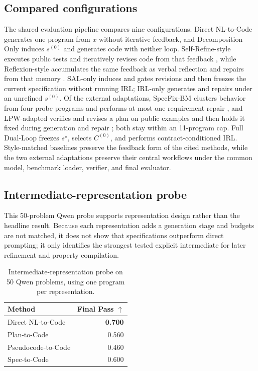 \documentclass{article}
\newcommand{\up}{\ensuremath{\uparrow}}
\begin{document}
\subsection{Compared configurations}

The shared evaluation pipeline compares nine configurations. Direct NL-to-Code generates one program from $x$ without iterative feedback, and Decomposition Only induces $s^{(0)}$ and generates code with neither loop. Self-Refine-style executes public tests and iteratively revises code from that feedback \citep{ref_self_refine}, while Reflexion-style accumulates the same feedback as verbal reflection and repairs from that memory \citep{ref_reflexion}. SAL-only induces and gates revisions and then freezes the current specification without running IRL; IRL-only generates and repairs under an unrefined $s^{(0)}$. Of the external adaptations, SpecFix-BM clusters behavior from four probe programs and performs at most one requirement repair \citep{ref_specfix}, and LPW-adapted verifies and revises a plan on public examples and then holds it fixed during generation and repair \citep{ref_planning_driven_programming}; both stay within an 11-program cap. Full Dual-Loop freezes $s^\star$, selects $C^{(0)}$, and performs contract-conditioned IRL. Style-matched baselines preserve the feedback form of the cited methods, while the two external adaptations preserve their central workflows under the common model, benchmark loader, verifier, and final evaluator.

\subsection{Intermediate-representation probe}

This 50-problem Qwen probe supports representation design rather than the headline result. Because each representation adds a generation stage and budgets are not matched, it does not show that specifications outperform direct prompting; it only identifies the strongest tested explicit intermediate for later refinement and property compilation.

\begin{table}[H]
\centering
\small
\begin{tabular}{@{}lr@{}}
\toprule
Method & Final Pass \up \\
\midrule
Direct NL-to-Code & \textbf{0.700} \\
Plan-to-Code & 0.560 \\
Pseudocode-to-Code & 0.460 \\
Spec-to-Code & 0.600 \\
\bottomrule
\end{tabular}
\caption{Intermediate-representation probe on 50 Qwen problems, using one program per representation.}
\label{tab:validation}
\end{table}
\end{document}
